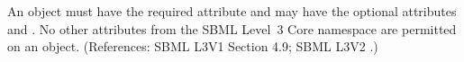 An \AssignmentRule object must have the required attribute 
and may have the optional attributes  and .
No other attributes from the SBML Level~3 Core namespace are permitted on
an \AssignmentRule object.  (References: SBML L3V1 Section 4.9; SBML L3V2
.)
